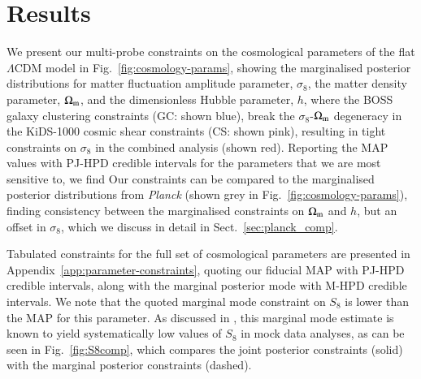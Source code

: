 \section{Results}
\label{sec:results}
We present our multi-probe constraints on the cosmological parameters of the flat $\Lambda$CDM model in Fig.~\ref{fig:cosmology-params}, showing the marginalised posterior distributions for matter fluctuation amplitude parameter, $\sigma_8$, the matter density parameter, $\Omega_{\rm m}$, and the dimensionless Hubble parameter, $h$, where the BOSS galaxy clustering constraints (GC: shown blue), break the $\sigma_8$-$\Omega_{\rm m}$ degeneracy in the KiDS-1000 cosmic shear constraints (CS: shown pink), resulting in tight constraints on $\sigma_8$ in the combined \tttp analysis (shown red). 
Reporting the MAP values with PJ-HPD credible intervals for the parameters that we are most sensitive to, we find 
Our constraints can be compared to the marginalised posterior distributions from {\it Planck} (shown grey in Fig.~\ref{fig:cosmology-params}), finding consistency between the marginalised constraints on $\Omega_{\rm m}$ and $h$, but an offset in $\sigma_8$,  which we discuss in detail in Sect.~\ref{sec:planck_comp}.

Tabulated constraints for the full set of cosmological parameters are presented in Appendix~\ref{app:parameter-constraints}, quoting our fiducial MAP with PJ-HPD credible intervals, along with the marginal posterior mode with M-HPD credible intervals. 
We note that the quoted marginal mode constraint on $S_8$ is \preliminary{$0.2\sigma$} lower than the MAP for this parameter. 
As discussed in \citet{joachimi/etal:inprep}, this marginal mode estimate is known to yield systematically low values of $S_8$ in mock data analyses, as can be seen in Fig.~\ref{fig:S8comp}, which compares the joint posterior constraints (solid) with the marginal posterior constraints (dashed).  


